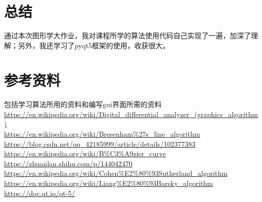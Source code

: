 \documentclass[a4paper,UTF8]{article}
\theoremstyle{definition}
\begin{document}
\section{总结}
通过本次图形学大作业，我对课程所学的算法使用代码自己实现了一遍，加深了理解；另外，我还学习了pyqt5框架的使用，收获很大。
\section{参考资料}
\paragraph{} 包括学习算法所用的资料和编写gui界面所需的资料\\
\url{https://en.wikipedia.org/wiki/Digital_differential_analyzer_(graphics_algorithm)}\\
\url{https://en.wikipedia.org/wiki/Bresenham\%27s_line_algorithm}\\
\url{https://blog.csdn.net/qq_42185999/article/details/102377383}\\
\url{https://en.wikipedia.org/wiki/B\%C3\%A9zier_curve}\\
\url{https://zhuanlan.zhihu.com/p/144042470}\\
\url{https://en.wikipedia.org/wiki/Cohen\%E2\%80\%93Sutherland_algorithm}\\
\url{https://en.wikipedia.org/wiki/Liang\%E2\%80\%93Barsky_algorithm}\\
\url{https://doc.qt.io/qt-5/}

%

\end{document}
